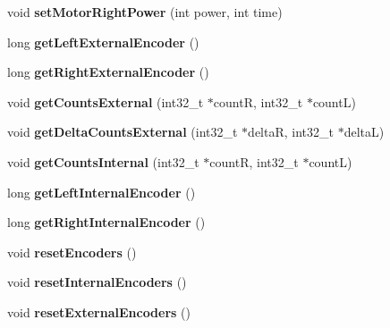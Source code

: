 \begin{DoxyCompactItemize}
void {\bfseries set\+Motor\+Right\+Power} (int power, int time)
\item 
\mbox{\label{classAsservDriver_aa6924c9da7428d59fa712c15221dfbac}} 
long {\bfseries get\+Left\+External\+Encoder} ()
\item 
\mbox{\label{classAsservDriver_afda042c513d96188f8572899679cc616}} 
long {\bfseries get\+Right\+External\+Encoder} ()
\item 
\mbox{\label{classAsservDriver_a40d638a52c2ef3c2e98fe4ffa9a7bfe9}} 
void {\bfseries get\+Counts\+External} (int32\+\_\+t $\ast$countR, int32\+\_\+t $\ast$countL)
\item 
\mbox{\label{classAsservDriver_a588e61ea789b256d73fd04b1f7a840b5}} 
void {\bfseries get\+Delta\+Counts\+External} (int32\+\_\+t $\ast$deltaR, int32\+\_\+t $\ast$deltaL)
\item 
\mbox{\label{classAsservDriver_a643c154d40a2842293fcbf433dc73ee1}} 
void {\bfseries get\+Counts\+Internal} (int32\+\_\+t $\ast$countR, int32\+\_\+t $\ast$countL)
\item 
\mbox{\label{classAsservDriver_a01959c5fd48ed61fedfb22a6c3605ea2}} 
long {\bfseries get\+Left\+Internal\+Encoder} ()
\item 
\mbox{\label{classAsservDriver_a00e162296e20e589d7117b2427908aa6}} 
long {\bfseries get\+Right\+Internal\+Encoder} ()
\item 
\mbox{\label{classAsservDriver_a1d4095fd5abc9597f5aa35fc4d02f3fa}} 
void {\bfseries reset\+Encoders} ()
\item 
\mbox{\label{classAsservDriver_a9375c998721a68c0fcdd1c538642fdc6}} 
void {\bfseries reset\+Internal\+Encoders} ()
\item 
\mbox{\label{classAsservDriver_a62108360983265520b0401a71f810f6a}} 
void {\bfseries reset\+External\+Encoders} ()
\item 
\mbox{\label{classAsservDriver_a69fb8c78d0ced7bd7f330c18952c84f4}} 

\end{DoxyCompactItemize}
